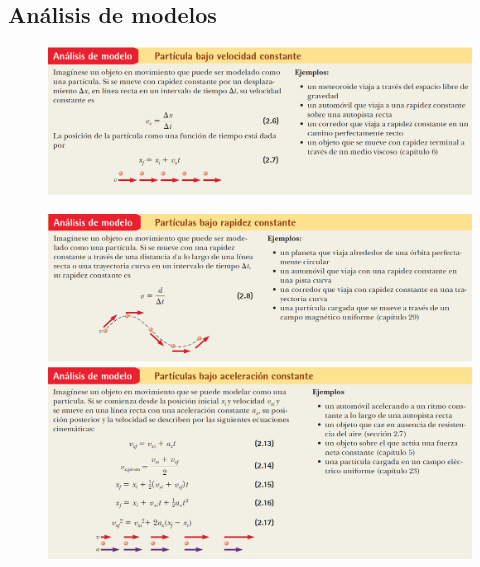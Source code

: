   \subsection{Análisis de modelos}
    \begin{figure}[H]
      \centering
      \includegraphics[scale=0.5]{1/graphics_2/figure_0a}
    \end{figure}
    \begin{figure}[H]
      \includegraphics[scale=0.5]{1/graphics_2/figure_0b}
      \includegraphics[scale=0.5]{1/graphics_2/figure_0c}
    \end{figure}

